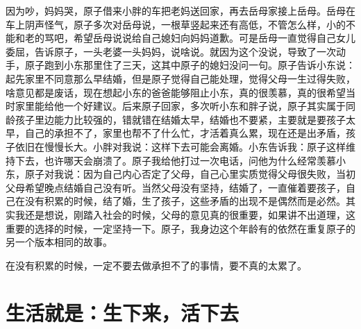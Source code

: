 因为吵，妈妈哭，原子借来小胖的车把老妈送回家，再去岳母家接上岳母。岳母在车上阴声怪气，原子多次对岳母说，一根草竖起来还有高低，不管怎么样，小的不能和老的骂吧，希望岳母说说给自己媳妇向妈妈道歉。可是岳母一直觉得自己女儿委屈，告诉原子，一头老婆一头妈妈，说啥说。就因为这个没说，导致了一次动手，原子跑到小东那里住了三天，这其中原子的媳妇没问一句。原子告诉小东说：起先家里不同意那么早结婚，但是原子觉得自己能处理，觉得父母一生过得失败，啥意见都是废话，现在想起小东的爸爸能够阻止小东，真的很羡慕，真的很希望当时家里能给他一个好建议。后来原子回家，多次听小东和胖子说，原子其实属于同龄孩子里边能力比较强的，错就错在结婚太早，结婚也不要紧，主要就是要孩子太早，自己的承担不了，家里也帮不了什么忙，才活着真么累，现在还是出矛盾，孩子依旧在慢慢长大。小胖对我说：这样下去可能会离婚。小东告诉我：原子这样维持下去，也许哪天会崩溃了。原子我给他打过一次电话，问他为什么经常羡慕小东，原子对我说：因为自己内心否定了父母，自己心里实质觉得父母很失败，当初父母希望晚点结婚自己没有听。当然父母没有坚持，结婚了，一直催着要孩子，自己在没有积累的时候，结了婚，生了孩子，这些矛盾的出现不是偶然而是必然。其实我还是想说，刚踏入社会的时候，父母的意见真的很重要，如果讲不出道理，这重要的选择的时候，一定坚持一下。原子，我身边这个年龄有的依然在重复原子的另一个版本相同的故事。

在没有积累的时候，一定不要去做承担不了的事情，要不真的太累了。

\section{生活就是：生下来，活下去}

